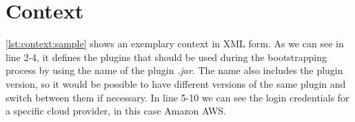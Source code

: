 \section{Context}
\label{implementation:context}

\vspace*{\baselineskip}

\autoref{lst:context:sample} shows an exemplary context in XML form.
As we can see in line 2-4, it defines the plugins that should be used during the bootstrapping process by using the name of the plugin \textit{.jar}.
The name also includes the plugin version, so it would be possible to have different versions of the same plugin and switch between them if necessary.
In line 5-10 we can see the login credentials for a specific cloud provider, in this case Amazon AWS.
